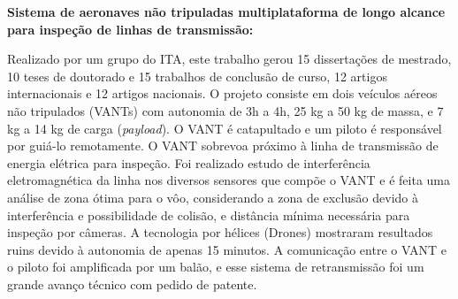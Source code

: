 
\textbf{Sistema de aeronaves não tripuladas multiplataforma de longo alcance
para inspeção de linhas de transmissão:}

Realizado por um grupo do ITA, este trabalho gerou 15 dissertações de
mestrado, 10 teses de doutorado e 15 trabalhos de conclusão de curso, 12 artigos internacionais e 12
artigos nacionais. O projeto consiste em dois veículos aéreos não tripulados
(VANTs) com autonomia de 3h a 4h, 25 kg a 50 kg de massa, e 7 kg a 14 kg de
carga (\textit{payload}). O VANT é catapultado e um piloto é responsável por
guiá-lo remotamente. O VANT sobrevoa próximo à linha de transmissão de energia
elétrica para inspeção. Foi realizado estudo de interferência eletromagnética da linha nos
diversos sensores que compõe o VANT e é feita uma análise de zona ótima para o
vôo, considerando a zona de exclusão devido à interferência e possibilidade de
colisão, e distância mínima necessária para inspeção por câmeras. A tecnologia
por hélices (Drones) mostraram resultados ruins devido à autonomia de apenas 15
minutos. A comunicação entre o VANT e o piloto foi amplificada por um balão, e
esse sistema de retransmissão foi um grande avanço técnico com pedido de
patente.
